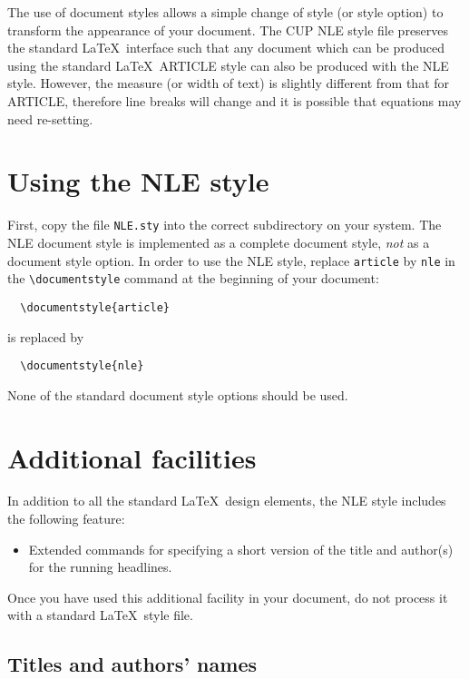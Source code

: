 \documentclass{nle}
\begin{document}
The use of document styles allows a simple change of style (or style option)
to transform the appearance of your document. The CUP NLE style file preserves
the standard \LaTeX\ interface such that any document which can be produced
using the standard \LaTeX\ ARTICLE style can also be produced with the
NLE style. However, the measure (or width of text) is slightly different
from that for ARTICLE, therefore line breaks will change and it is possible
that equations may need re-setting.

\section{Using the NLE style}

First, copy the file \verb"NLE.sty" into the correct subdirectory on your
system. The NLE document style is implemented as a complete document style,
{\em not\/} as a document style option. In order to use the NLE style,
replace \verb"article" by \verb"nle" in the \verb"\documentstyle" command
at the beginning of your document:
%
\begin{verbatim}
  \documentstyle{article}
\end{verbatim}
%
is replaced by
%
\begin{verbatim}
  \documentstyle{nle}
\end{verbatim}
%
None of the standard document style options should be used.

\section{Additional facilities}

In addition to all the standard \LaTeX\ design elements, the NLE style
includes the following feature:
\begin{itemize}
  \item Extended commands for specifying a short version
        of the title and author(s) for the running
        headlines.
\end{itemize}
Once you have used this additional facility in your document,
do not process it with a standard \LaTeX\ style file.

\subsection{Titles and authors' names}
\end{document}
